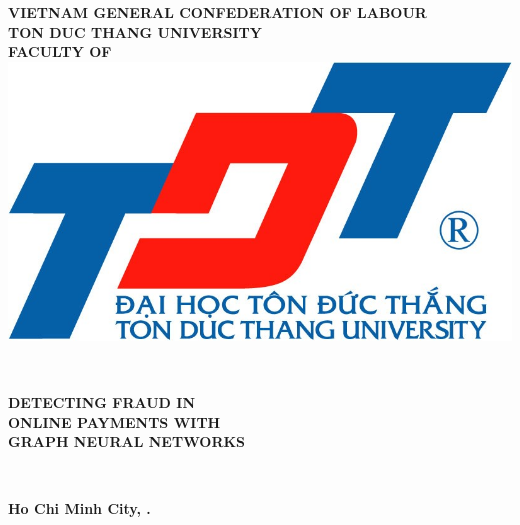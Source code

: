 \begin{center}
	\large{\textbf{VIETNAM GENERAL CONFEDERATION OF LABOUR}} \\
	\large{\textbf{TON DUC THANG UNIVERSITY}} \\
	\large{\textbf{\MakeUppercase{FACULTY OF \khoa}}} \\\vspace*{1cm}	
	\includegraphics[width=0.5\linewidth]{lib/TDTlogo.jpg}\\\vspace*{1cm}	
	
	\large{\textbf{\tacgia}}\\\vspace*{1.5cm}
	

	\LARGE{\textbf{\MakeUppercase{Detecting Fraud in \\ Online Payments with \\Graph Neural Networks}}}\\\vspace*{1.5cm}
	
	\LARGE{\textbf{\MakeUppercase{\chuyennganh}}}\\\vspace*{1.5cm}
	
	\Large{\textbf{\MakeUppercase{\monhoc}}}\vspace*{1.5cm}

	\large{\textbf{Ho Chi Minh City, \nam.}}
\end{center}